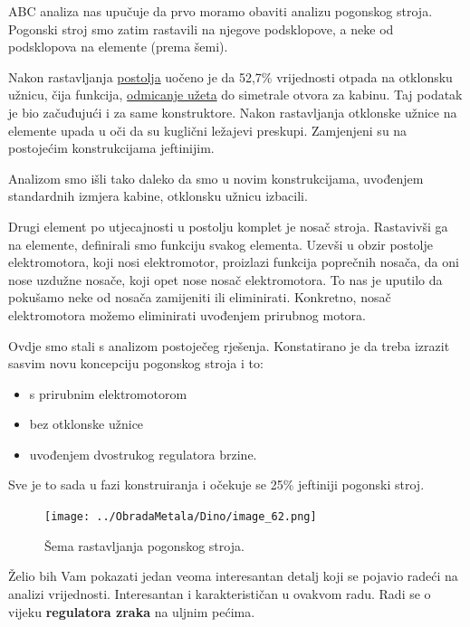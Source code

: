 \documentclass[a4paper,12pt]{article}
\numberwithin{figure}{section}
\begin{document}
ABC analiza nas upučuje da prvo moramo obaviti analizu pogonskog stroja. Pogonski stroj smo zatim rastavili na njegove podsklopove, a neke od podsklopova na elemente (prema šemi).\par
Nakon rastavljanja \underline{postolja} uočeno je da 52,7\% vrijednosti otpada na otklonsku užnicu, čija funkcija, \underline{odmicanje užeta} do simetrale otvora za kabinu. Taj podatak je bio začuđujući i za same konstruktore. Nakon rastavljanja otklonske užnice na elemente upada u oči da su kuglični ležajevi preskupi. Zamjenjeni su na postojećim konstrukcijama jeftinijim.\par
Analizom smo išli tako daleko da smo u novim konstrukcijama, uvođenjem standardnih izmjera kabine, otklonsku užnicu izbacili.\par
Drugi element po utjecajnosti u postolju komplet je nosač stroja. Rastavivši ga na elemente, definirali smo funkciju svakog elementa. Uzevši u obzir postolje elektromotora, koji nosi elektromotor, proizlazi funkcija poprečnih nosača, da oni nose uzdužne nosače, koji opet nose nosač elektromotora. To nas je uputilo da pokušamo neke od nosača zamijeniti ili eliminirati. Konkretno, nosač elektromotora možemo eliminirati uvođenjem prirubnog motora.\par
Ovdje smo stali s analizom postoječeg rješenja. Konstatirano je da treba izrazit sasvim novu koncepciju pogonskog stroja i to:
\begin{itemize}
\item s prirubnim elektromotorom
\item bez otklonske užnice
\item uvođenjem dvostrukog regulatora brzine.
\end{itemize}
Sve je to sada u fazi konstruiranja i očekuje se 25\% jeftiniji pogonski stroj.
\begin{figure}[!h]
\centering
\texttt{[image: ../ObradaMetala/Dino/image\_62.png]}
\end{figure}
\FloatBarrier
\clearpage
\begin{landscape}
\begin{figure}

\caption{Šema rastavljanja pogonskog stroja.}\label{Slika2}
\end{figure}
\end{landscape}
\clearpage

Želio bih Vam pokazati jedan veoma interesantan detalj koji se pojavio radeći na analizi vrijednosti. Interesantan i karakterističan u ovakvom radu. Radi se o vijeku \textbf{regulatora zraka} na uljnim pećima.\par
\end{document}
